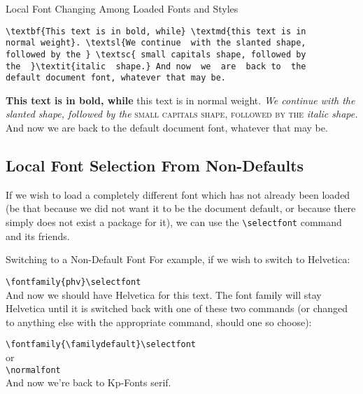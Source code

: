\documentclass[a4paper,oneside,11pt]{article}
\begin{document}
\begin{titled-frame}
{\textsf{Local Font Changing Among Loaded Fonts and Styles}}
\vspace{-1em}
\begin{verbatim}
\textbf{This text is in bold, while} \textmd{this text is in
normal weight}. \textsl{We continue  with the slanted shape,
followed by the } \textsc{ small capitals shape, followed by
the  }\textit{italic  shape.} And now  we  are  back to  the
default document font, whatever that may be.
\end{verbatim}
\textbf{This text is in bold, while} \textmd{this text is in
normal weight}. \textsl{We continue  with the slanted shape,
followed by the } \textsc{ small capitals shape, followed by
the  }\textit{italic  shape.} And now  we  are  back to  the
default document font, whatever that may be.
\end{titled-frame}


\subsection{Local Font Selection From Non-Defaults}
\label{subsec:fontsel:local:nondefaults}

If we  wish to  load a completely  different font which  has not  already been
loaded (be  that because we  did not  want it to  be the document  default, or
because  there simply  does  not exist  a  package  for it),  we  can use  the
\verb|\selectfont| command and its friends.  

\begin{titled-frame}{\sffamily Switching to a Non-Default Font}
For example, if we wish to switch to Helvetica:

\vspace{1em}\noindent
\verb|\fontfamily{phv}\selectfont|\\

\selectfont  And  now  we   should  have  Helvetica  for  this
text. The font family  will stay Helvetica until it is  switched back with one
of  these two  commands  (or changed  to anything  else  with the  appropriate
command, should one so choose):

\vspace{1em}\noindent
\verb|\fontfamily{\familydefault}\selectfont|\\[1ex]
or\\[1ex]
\noindent
\verb|\normalfont|\\

\noindent\normalfont And now we're back to Kp-Fonts serif.
\end{titled-frame}
\end{document}
